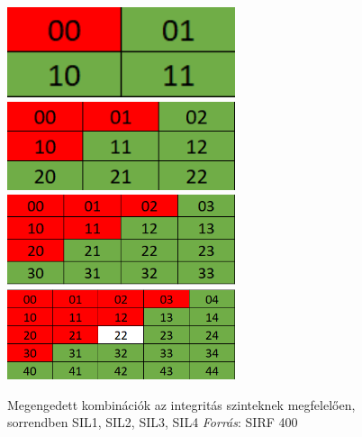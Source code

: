 \begin{figure}[!ht]
	\centering
	\includegraphics[width=67mm, keepaspectratio]{figures/sirf_sil1.png}\hspace{1cm}
	\includegraphics[width=67mm, keepaspectratio]{figures/sirf_sil2.png}\\\vspace{1cm}
	\includegraphics[width=67mm, keepaspectratio]{figures/sirf_sil3.png}\hspace{1cm}
	\includegraphics[width=67mm, keepaspectratio]{figures/sirf_sil4.png}
	\caption{Megengedett kombinációk az integritás szinteknek megfelelően, sorrendben SIL1, SIL2, SIL3, SIL4 \emph{Forrás}: SIRF 400}
	\label{fig:sirfSIL}
\end{figure}